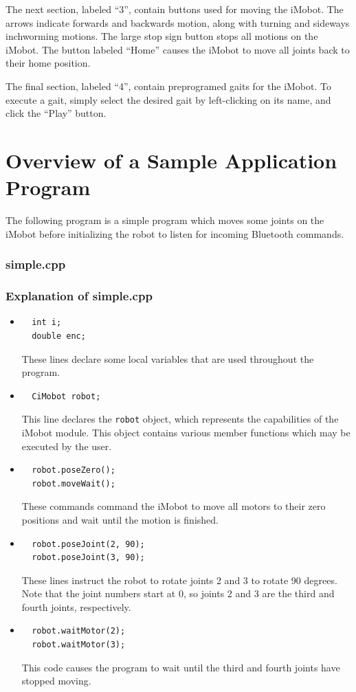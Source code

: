 \documentclass[11pt]{report}
\begin{document}
The next section, labeled ``3'', contain buttons used for moving the iMobot. 
The arrows indicate forwards and backwards motion, along with turning and
sideways inchworming motions. The large stop sign button stops all motions
on the iMobot. The button labeled ``Home'' causes the iMobot to move all joints
back to their home position. 

The final section, labeled ``4'', contain preprogramed gaits for the iMobot.
To execute a gait, simply select the desired gait by left-clicking on its name,
and click the ``Play'' button.

\chapter{Overview of a Sample Application Program}
The following program is a simple program which moves some joints on the iMobot
before initializing the robot to listen for incoming Bluetooth commands.
\subsection{simple.cpp \label{subsec:simple.cpp}}
\subsection{Explanation of simple.cpp}
\begin{itemize}
\item 
\begin{verbatim}
  int i;
  double enc;
\end{verbatim}
These lines declare some local variables that are used throughout the program.
\item 
\begin{verbatim}
  CiMobot robot;
\end{verbatim}
This line declares the \texttt{robot} object, which represents the
capabilities of the iMobot module. This object contains various member
functions which may be executed by the user.
\item 
\begin{verbatim}
  robot.poseZero();
  robot.moveWait();
\end{verbatim}
These commands command the iMobot to move all motors to their zero positions
and wait until the motion is finished.
\item 
\begin{verbatim}
  robot.poseJoint(2, 90);
  robot.poseJoint(3, 90);
\end{verbatim}
These lines instruct the robot to rotate joints 2 and 3 to rotate 90
degrees. Note that the joint numbers start at 0, so joints 2 and 3 are the
third and fourth joints, respectively. 
\item 
\begin{verbatim}
  robot.waitMotor(2);
  robot.waitMotor(3);
\end{verbatim}
This code causes the program to wait until the third and fourth
joints have stopped moving.
\end{itemize}
\end{document}
